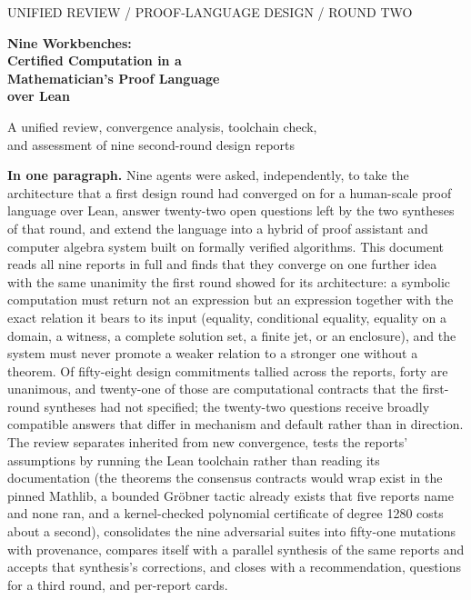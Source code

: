 \documentclass[11pt,a4paper]{article}
\theoremstyle{definition}
\begin{document}
\begin{titlepage}
\vspace*{4mm}
{\sffamily\small\color{muted}UNIFIED REVIEW \quad / \quad PROOF-LANGUAGE DESIGN \quad / \quad ROUND TWO\par}
\vspace{7mm}
{\sffamily\bfseries\color{ink}\fontsize{28}{34}\selectfont Nine Workbenches:\\Certified Computation in a\\Mathematician's Proof Language\\over Lean\par}
\vspace{5mm}
{\sffamily\LARGE A unified review, convergence analysis, toolchain check,\\and assessment of nine second-round design reports\par}
\vspace{8mm}
\begin{keybox}
\textbf{In one paragraph.} Nine agents were asked, independently, to take the architecture that a first design round had converged on for a human-scale proof language over Lean, answer twenty-two open questions left by the two syntheses of that round, and extend the language into a hybrid of proof assistant and computer algebra system built on formally verified algorithms. This document reads all nine reports in full and finds that they converge on one further idea with the same unanimity the first round showed for its architecture: a symbolic computation must return not an expression but an expression together with the exact relation it bears to its input (equality, conditional equality, equality on a domain, a witness, a complete solution set, a finite jet, or an enclosure), and the system must never promote a weaker relation to a stronger one without a theorem. Of fifty-eight design commitments tallied across the reports, forty are unanimous, and twenty-one of those are computational contracts that the first-round syntheses had not specified; the twenty-two questions receive broadly compatible answers that differ in mechanism and default rather than in direction. The review separates inherited from new convergence, tests the reports' assumptions by running the Lean toolchain rather than reading its documentation (the theorems the consensus contracts would wrap exist in the pinned Mathlib, a bounded Gr\"obner tactic already exists that five reports name and none ran, and a kernel-checked polynomial certificate of degree 1280 costs about a second), consolidates the nine adversarial suites into fifty-one mutations with provenance, compares itself with a parallel synthesis of the same reports and accepts that synthesis's corrections, and closes with a recommendation, questions for a third round, and per-report cards.

\end{keybox}
\end{titlepage}
\end{document}
